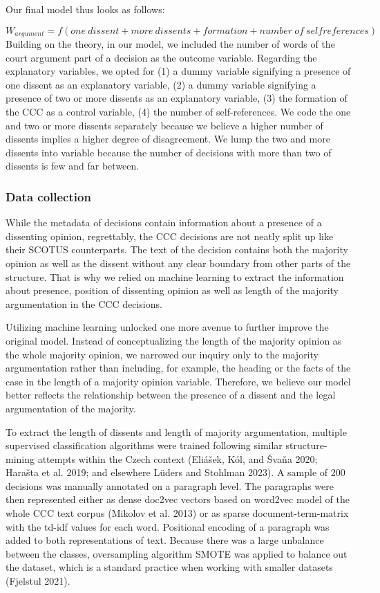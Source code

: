 \documentclass[
  11pt,
]{article}
\begin{document}
Our final model thus looks as follows:

\[
W_{argument} = f(one\:dissent + more\:dissents + formation + number\:of\:selfreferences)
\] Building on the theory, in our model, we included the number of words
of the court argument part of a decision as the outcome variable.
Regarding the explanatory variables, we opted for (1) a dummy variable
signifying a presence of one dissent as an explanatory variable, (2) a
dummy variable signifying a presence of two or more dissents as an
explanatory variable, (3) the formation of the CCC as a control
variable, (4) the number of self-references. We code the one and two or
more dissents separately because we believe a higher number of dissents
implies a higher degree of disagreement. We lump the two and more
dissents into variable because the number of decisions with more than
two of dissents is few and far between.

\hypertarget{data-collection}{%
\subsubsection{Data collection}\label{data-collection}}

While the metadata of decisions contain information about a presence of
a dissenting opinion, regrettably, the CCC decisions are not neatly
split up like their SCOTUS counterparts. The text of the decision
contains both the majority opinion as well as the dissent without any
clear boundary from other parts of the structure. That is why we relied
on machine learning to extract the information about presence, position
of dissenting opinion as well as length of the majority argumentation in
the CCC decisions.

Utilizing machine learning unlocked one more avenue to further improve
the original model. Instead of conceptualizing the length of the
majority opinion as the whole majority opinion, we narrowed our inquiry
only to the majority argumentation rather than including, for example,
the heading or the facts of the case in the length of a majority opinion
variable. Therefore, we believe our model better reflects the
relationship between the presence of a dissent and the legal
argumentation of the majority.

To extract the length of dissents and length of majority argumentation,
multiple supervised classification algorithms were trained following
similar structure-mining attempts within the Czech context (Eliášek,
Kól, and Švaňa 2020; Harašta et al. 2019; and elsewhere Lüders and
Stohlman 2023). A sample of 200 decisions was manually annotated on a
paragraph level. The paragraphs were then represented either as dense
doc2vec vectors based on word2vec model of the whole CCC text corpus
(Mikolov et al. 2013) or as sparse document-term-matrix with the td-idf
values for each word. Positional encoding of a paragraph was added to
both representations of text. Because there was a large unbalance
between the classes, oversampling algorithm SMOTE was applied to balance
out the dataset, which is a standard practice when working with smaller
datasets (Fjelstul 2021).
\end{document}
